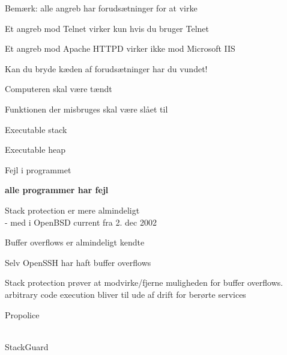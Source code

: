 \documentclass[20pt,landscape,a4paper,footrule]{foils}
\begin{document}

\begin{list1}
\item Bemærk: alle angreb har forudsætninger for at virke
\item Et angreb mod Telnet virker kun hvis du bruger Telnet
\item Et angreb mod Apache HTTPD virker ikke mod Microsoft IIS
\item Kan du bryde kæden af forudsætninger har du vundet!
\end{list1}



\begin{list1}
\item Computeren skal være tændt
\item Funktionen der misbruges skal være slået til
\item Executable stack
\item Executable heap
\item Fejl i programmet
\end{list1}
\pause
\vskip 2cm 

\centerline{\color{titlecolor}\LARGE \bf alle programmer har fejl}



\begin{list1}
\item Stack protection er mere almindeligt\\
- med i OpenBSD current fra 2. dec 2002

\item Buffer overflows er almindeligt kendte
\begin{list2}    
\item Selv OpenSSH har haft buffer overflows
\item Stack protection prøver at modvirke/fjerne
  muligheden for buffer overflows. arbitrary code execution
  bliver til ude af drift for berørte services
\end{list2}

\item Propolice\\
\\

\item StackGuard\\
\end{list1}
\end{document}
